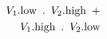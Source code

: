 \documentclass[preview]{standalone}
\begin{document}
\begin{align*}
V_1.\text{low}\hspace{0.5em}.\hspace{0.5em} V_2.\text{high} \hspace{0.5em} + \\V_1.\text{high}\hspace{0.5em}.\hspace{0.5em} V_2.\text{low}
\end{align*}
\end{document}
